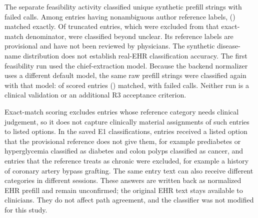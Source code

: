 The separate feasibility activity classified \PrefillFeasibilityStrings{}
unique synthetic prefill strings with \PrefillFeasibilityFailed{} failed calls.
Among \PrefillFeasibilityScored{} entries having nonambiguous author reference
labels, \PrefillFeasibilityExact{} (\PrefillFeasibilityExactRate{}) matched
exactly. Of \PrefillFeasibilityTruncated{} truncated entries, which were excluded
from that exact-match denominator, \PrefillFeasibilityTruncatedGuessed{} were
classified beyond unclear. Its reference labels are provisional and have not
been reviewed by physicians. The synthetic disease-name distribution does not
establish real-EHR classification accuracy. The first feasibility run used the
chief-extraction model. Because the backend normalizer uses a different default
model, the same raw prefill strings were classified again with that model:
\PrefillDeployedFeasibilityExact{} of \PrefillDeployedFeasibilityScored{} scored
entries (\PrefillDeployedFeasibilityExactRate{}) matched, with
\PrefillDeployedFeasibilityFailed{} failed calls. Neither run is a clinical
validation or an additional R3 acceptance criterion.

Exact-match scoring excludes entries whose reference category needs clinical
judgement, so it does not capture clinically material assignments of such
entries to listed options. In the saved E1 classifications,
\EOnePrefillListedDisagree{} entries received a listed option that the provisional
reference does not give them, for example prediabetes or hyperglycemia classified
as diabetes and colon polyps classified as cancer, and
\EOnePrefillChronicExcluded{} entries that the reference treats as chronic were
excluded, for example a history of coronary artery bypass grafting. The same entry
text can also receive different categories in different sessions. These answers
are written back as normalized EHR prefill and remain unconfirmed; the original
EHR text stays available to clinicians. They do not affect path agreement, and
the classifier was not modified for this study.

